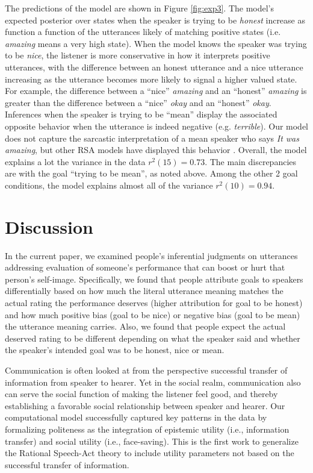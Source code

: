 \documentclass[10pt,letterpaper]{article}
\newcommand{\mht}[1]{\textcolor{DarkOrange}{[mht: #1]}}
\begin{document}
The predictions of the model are shown in Figure \ref{fig:exp3}.
The model's expected posterior over states when the speaker is trying to be \emph{honest} increase as function a function of the utterances likely of matching positive states (i.e. \emph{amazing} means a very high state).
When the model knows the speaker was trying to be \emph{nice}, the listener is more conservative in how it interprets positive utterances, with the difference between an honest utterance and a nice utterance increasing as the utterance becomes more likely to signal a higher valued state. 
For example, the difference between a ``nice'' \emph{amazing} and an ``honest'' \emph{amazing} is greater than the difference between a ``nice'' \emph{okay} and an ``honest'' \emph{okay}.
Inferences when the speaker is trying to be ``mean'' display the associated opposite behavior when the utterance is indeed negative (e.g. \emph{terrible}).
Our model does not capture the sarcastic interpretation of a mean speaker who says \emph{It was amazing}, but other RSA models have displayed this behavior \cite{Kao2015}. %
Overall, the model explains a lot the variance in the data $r^2(15) = 0.73$. 
The main discrepancies are with the goal ``trying to be mean'', as noted above. 
Among the other 2 goal conditions, the model explains almost all of the variance $r^2(10) = 0.94$. 

\section{Discussion}

In the current paper, we examined people's inferential judgments on utterances addressing evaluation of someone's performance that can boost or hurt that person's self-image. Specifically, we found that people attribute goals to speakers differentially based on how much the literal utterance meaning matches the actual rating the performance deserves (higher attribution for goal to be honest) and how much positive bias (goal to be nice) or negative bias (goal to be mean) the utterance meaning carries. Also, we found that people expect the actual deserved rating to be different depending on what the speaker said and whether the speaker's intended goal was to be honest, nice or mean. 

Communication is often looked at from the perspective successful transfer of information from speaker to hearer. 
Yet in the social realm, communication also can serve the social function of making the listener feel good, and thereby establishing a favorable social relationship between speaker and hearer.
Our computational model successfully captured key patterns in the data by formalizing politeness as the integration of epistemic utility (i.e., information transfer) and social utility (i.e., face-saving). This is the first work to generalize the Rational Speech-Act theory to include utility parameters not based on the successful transfer of information. 
\end{document}
